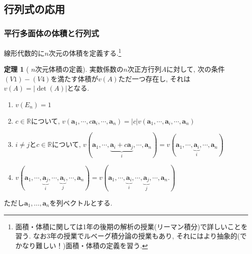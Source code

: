 \documentclass[dvipdfmx,a4paper,11pt]{article} %
\newcommand{\R}{\mathbb{R}}
\theoremstyle{definition}
\newtheorem{thm}{定理}
\begin{document}
\subsection{行列式の応用 \cite[3.5節]{O}}


\subsubsection{平行多面体の体積と行列式}

線形代数的に$n$次元の体積を定義する.\footnote{面積・体積に関しては1年の後期の解析の授業(リーマン積分)で詳しいことを習う. なお3年の授業でルベーグ積分論の授業もあり, それにはより抽象的(でかなり難しい！)面積・体積の定義を習う. }
\begin{thm}[{\cite[定理 3.5.1 ]{O} $n$次元体積の定義}]
実数係数の$n$次正方行列$A$に対して, 次の条件$(V1)-(V4)$を満たす体積が$v(A)$ただ一つ存在し, 
それは$v(A)=|\det(A)|$となる.
\begin{enumerate}
\item[(V1)] $v(E_n)=1$
\item[(V2)] $c \in \R$について, 
$v( \bm{a}_1, \cdots, c\bm{a}_i , \cdots, \bm{a}_n) = |c|v( \bm{a}_1, \cdots, \bm{a}_i , \cdots, \bm{a}_n)$
\item[(V3)] $i \neq j$と$c \in \R$について, 
$v( \bm{a}_1, \cdots, \underbrace{\bm{a}_i + c\bm{a}_j}_{i}, \cdots, \bm{a}_n) 
=
v(
    \bm{a}_1, \cdots, \underbrace{\bm{a}_i}_{i}, \cdots, \bm{a}_n
)
$
\item[(V4)] 
$v(
    \bm{a}_1, \cdots, \underbrace{\bm{a}_j}_{i}, \cdots , \underbrace{\bm{a}_i}_{j}, \cdots, \bm{a}_n
)
=
v(
    \bm{a}_1, \cdots, \underbrace{\bm{a}_i}_{i}, \cdots , \underbrace{\bm{a}_j}_{j}, \cdots, \bm{a}_n.
)$
\end{enumerate}
ただし$\bm{a}_1, \ldots, \bm{a}_n$を列ベクトルとする. 
\end{thm}
\end{document}
